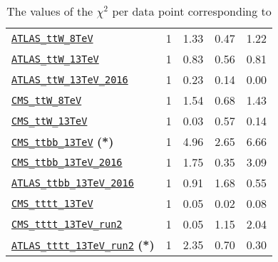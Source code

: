 \begin{table}[htbp]
\begin{tabular}{l|C{1.1cm}|C{2.1cm}|C{2.5cm}|C{2.5cm}}
\href{https://arxiv.org/abs/1509.05276}{\tt ATLAS\_ttW\_8TeV} & 1 & 1.33   & 0.47    & 1.22      \\
\href{https://arxiv.org/abs/1609.01599}{\tt ATLAS\_ttW\_13TeV} & 1 &  0.83   &  0.56   & 0.81      \\
\href{https://arxiv.org/abs/1901.03584}{\tt ATLAS\_ttW\_13TeV\_2016} & 1 &   0.23   & 0.14    &  0.00      \\
\href{https://arxiv.org/abs/1510.01131}{\tt CMS\_ttW\_8TeV} & 1 &  1.54    &  0.68     &  1.43     \\
\href{https://arxiv.org/abs/1711.02547}{\tt CMS\_ttW\_13TeV} & 1 &  0.03   &   0.57    &  0.14     \\
\midrule
\href{https://arxiv.org/abs/1705.10141}{\tt CMS\_ttbb\_13TeV}  {{\bf (*)}} & 1 &  4.96    &  2.65     &  6.66     \\
\href{https://arxiv.org/abs/1909.05306}{\tt CMS\_ttbb\_13TeV\_2016} & 1 &  1.75    &  0.35     &  3.09     \\
\href{https://arxiv.org/abs/1811.12113}{\tt ATLAS\_ttbb\_13TeV\_2016} & 1 & 0.91     &  1.68     &  0.55     \\
\href{https://arxiv.org/abs/1710.10614}{\tt CMS\_tttt\_13TeV} & 1 &  0.05   & 0.02      &  0.08     \\
\href{https://arxiv.org/abs/1908.06463}{\tt CMS\_tttt\_13TeV\_run2} & 1 &  0.05    & 1.15      &  2.04     \\
\href{https://arxiv.org/abs/2007.14858}{\tt ATLAS\_tttt\_13TeV\_run2}  {{\bf (*)}} & 1 &  2.35   &  0.70     &  0.30     \\
\bottomrule
\end{tabular}
\caption{\small The values of the $\chi^2$ per data point corresponding to
}
\end{table}
